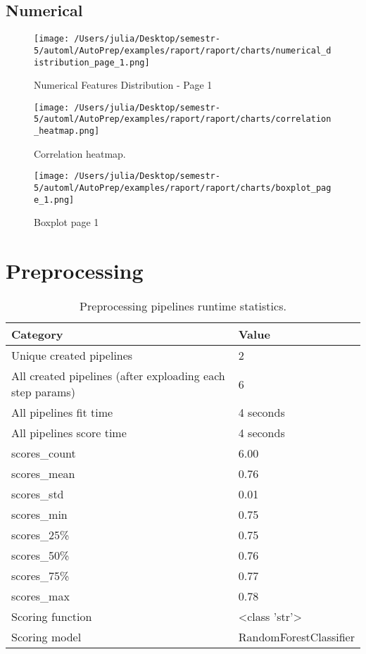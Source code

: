 \documentclass{article}%
\begin{document}
%
\subsection{Numerical}%
\label{subsec:Numerical}%

%


\begin{figure}[H]%
\centering%
\texttt{[image: /Users/julia/Desktop/semestr-5/automl/AutoPrep/examples/raport/raport/charts/numerical\_distribution\_page\_1.png]}%
\caption{Numerical Features Distribution {-} Page 1}%
\end{figure}

%


\begin{figure}[H]%
\centering%
\texttt{[image: /Users/julia/Desktop/semestr-5/automl/AutoPrep/examples/raport/raport/charts/correlation\_heatmap.png]}%
\caption{Correlation heatmap.}%
\end{figure}

%


\begin{figure}[H]%
\centering%
\texttt{[image: /Users/julia/Desktop/semestr-5/automl/AutoPrep/examples/raport/raport/charts/boxplot\_page\_1.png]}%
\caption{Boxplot page 1}%
\end{figure}

%
\section{Preprocessing}%
\label{sec:Preprocessing}%

%


\begin{table}[H]%
\begin{center}%
\begin{tabular}{l l}%
\hline%
\textbf{Category}&\textbf{Value}\\%
\hline%
Unique created pipelines&2\\%
All created pipelines (after exploading each step params)&6\\%
All pipelines fit time&4 seconds\\%
All pipelines score time&4 seconds\\%
scores\_count&6.00\\%
scores\_mean&0.76\\%
scores\_std&0.01\\%
scores\_min&0.75\\%
scores\_25\%&0.75\\%
scores\_50\%&0.76\\%
scores\_75\%&0.77\\%
scores\_max&0.78\\%
Scoring function&<class 'str'>\\%
Scoring model&RandomForestClassifier\\%
\hline%
\end{tabular}%
\end{center}%
\caption{Preprocessing pipelines runtime statistics.}%
\end{table}
\end{document}
